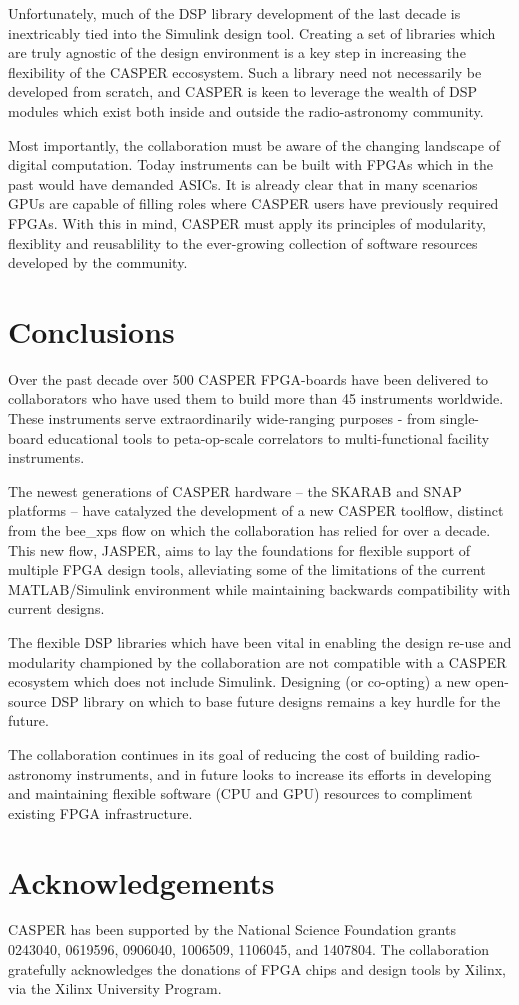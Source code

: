 \documentclass{ws-jai}
\begin{document}
Unfortunately, much of the DSP library development of the last decade is inextricably tied into the Simulink design tool. Creating a set of libraries which are truly agnostic of the design environment is a key step in increasing the flexibility of the CASPER eccosystem. Such a library need not necessarily be developed from scratch, and CASPER is keen to leverage the wealth of DSP modules which exist both inside and outside the radio-astronomy community.

Most importantly, the collaboration must be aware of the changing landscape of digital computation. Today instruments can be built with FPGAs which in the past would have demanded ASICs. It is already clear that in many scenarios GPUs are capable of filling roles where CASPER users have previously required FPGAs. With this in mind, CASPER must apply its principles of modularity, flexiblity and reusablility to the ever-growing collection of software resources developed by the community.

\section{Conclusions} \label{sec:Conclusions}
Over the past decade over 500 CASPER FPGA-boards have been delivered to collaborators who have used them to build more than 45 instruments worldwide. These instruments serve extraordinarily wide-ranging purposes - from single-board educational tools to peta-op-scale correlators to multi-functional facility instruments.

The newest generations of CASPER hardware -- the SKARAB and SNAP platforms -- have catalyzed the development of a new CASPER toolflow, distinct from the bee\_xps flow on which the collaboration has relied for over a decade. This new flow, JASPER, aims to lay the foundations for flexible support of multiple FPGA design tools, alleviating some of the limitations of the current MATLAB/Simulink environment while maintaining backwards compatibility with current designs.

The flexible DSP libraries which have been vital in enabling the design re-use and modularity championed by the collaboration are not compatible with a CASPER ecosystem which does not include Simulink. Designing (or co-opting) a new open-source DSP library on which to base future designs remains a key hurdle for the future.

The collaboration continues in its goal of reducing the cost of building radio-astronomy instruments, and in future looks to increase its efforts in developing and maintaining flexible software (CPU and GPU) resources to compliment existing FPGA infrastructure.

\section{Acknowledgements}
CASPER has been supported by the National Science Foundation grants 0243040,  0619596,  0906040,  1006509,  1106045, and 1407804. The collaboration gratefully acknowledges the donations of FPGA chips and design tools by Xilinx, via the Xilinx University Program.





\end{document}
